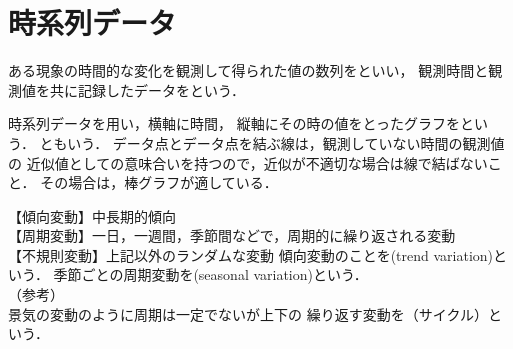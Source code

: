 \newcommand{\Draft}{}
\newcommand{\Slide}{}
\newcommand{\PrintLecture}{1}
\newcommand{\PrintSolution}{1}








\maketitle

\MyFrame{}{\tableofcontents}

\section{時系列データ}

\MyFrame{}
{
  { 
    ある現象の時間的な変化を観測して得られた値の数列をといい，
    観測時間と観測値を共に記録したデータをという．
  }
}

\MyFrame{}
{
  { 
    時系列データを用い，横軸に時間，
    縦軸にその時の値をとったグラフをという．
    ともいう．
  }
}
{
  {
    データ点とデータ点を結ぶ線は，観測していない時間の観測値の
    近似値としての意味合いを持つので，近似が不適切な場合は線で結ばないこと．
    その場合は，棒グラフが適している．
  }
}

\MyFrame{\insertsection}
{
  {
   【傾向変動】中長期的傾向\\
   【周期変動】一日，一週間，季節間などで，周期的に繰り返される変動\\
   【不規則変動】上記以外のランダムな変動
  }
  傾向変動のことを(trend variation)という．
  季節ごとの周期変動を(seasonal variation)という．\\
  （参考）\\
  景気の変動のように周期は一定でないが上下の
  繰り返す変動を（サイクル）という．
}

